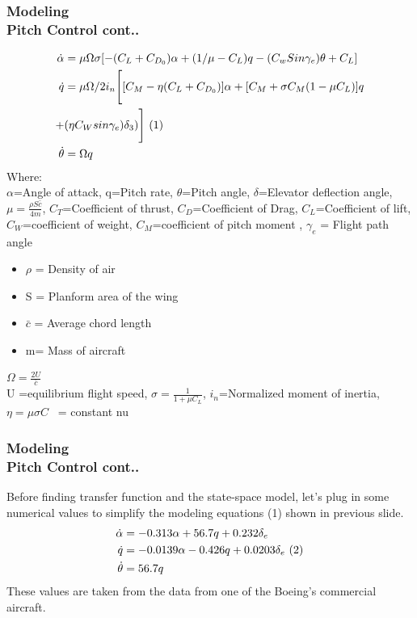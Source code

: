 \documentclass[hyperref={pdfpagelabels=true}]{beamer}
\newcounter{angle}
\begin{document}
\begin{frame}
\frametitle{Modeling\\ {\large Pitch Control {\tiny cont..}}}
\scriptsize{
\begin{align*}
\dot{\alpha}&=\mu\Omega\sigma[-(C_L+C_{D_0})\alpha+(1/ \mu -C_L)q-(C_wSin\gamma_e)\theta+C_L] \\ 
\dot{q}&=\mu\Omega/2i_n \Bigg[ [C_M-\eta(C_L+C_{D_0})]\alpha 
 + [C_M+\sigma C_M(1-\mu C_L)]q \\ +& (\eta C_Wsin\gamma_e)\delta_3) \Bigg] \ \text(1) \\
\dot{\theta}&=\Omega q
\end{align*}
Where: \\
 $\alpha$=Angle of attack,  
q=Pitch rate, 
$\theta$=Pitch angle, 
$\delta $=Elevator deflection angle,  
$\mu=\frac{\rho S\bar{c}}{4m}$,
$C_T$=Coefficient of thrust, $C_D$=Coefficient of Drag, $C_L$=Coefficient of lift, $C_W$=coefficient of weight, $C_M$=coefficient of pitch moment , $\gamma_e$ = Flight path angle
\begin{itemize}
\item[] $\rho$ = Density of air
\item[] S = Planform area of the wing 
\item[] $\bar{c}$ = Average chord length
\item[] m= Mass of aircraft
\end{itemize}
$\Omega=\frac{2U}{\bar{c}}$ \\
U =equilibrium flight speed, 
$\sigma =\frac{1}{1+\mu C_L}$, $i_n$=Normalized moment of inertia, $\eta=\mu \sigma C$ \ = constant nu
}
\end{frame}


\begin{frame}
\frametitle{Modeling\\ {\large Pitch Control {\tiny cont..}}}
Before finding transfer function and the state-space model, let's plug in some numerical values to simplify the modeling equations (1) shown in previous slide.
\begin{align*}
\dot{\alpha}&=-0.313\alpha+56.7q+0.232 \delta_e \\ 
\dot{q}&=-0.0139\alpha -0.426q + 0.0203 \delta_e \ \text(2) \\
\dot{\theta}&=56.7 q
\end{align*}
These values are taken from the data from one of the Boeing's commercial aircraft.
\end{frame}
\end{document}
